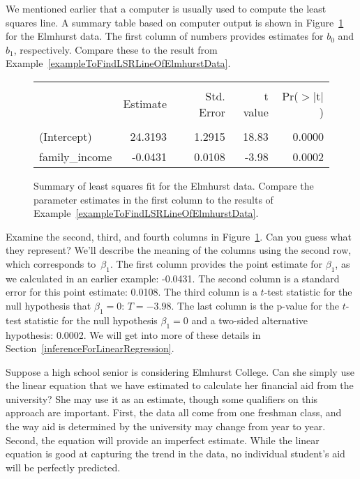 We mentioned earlier that a computer is usually used to compute the least squares line. A summary table based on computer output is shown in Figure~\ref{rOutputForIncomeAidLSRLine} for the Elmhurst data. The first column of numbers provides estimates for ${b}_0$ and ${b}_1$, respectively. Compare these to the result from Example~\ref{exampleToFindLSRLineOfElmhurstData}.

\begin{figure}[ht]
\centering
\begin{tabular}{l rrrr}
  \hline
  \vspace{-3.7mm} & & & & \\
 & Estimate & Std. Error & t value & Pr($>$$|$t$|$) \\ 
  \hline
  \vspace{-3.6mm} & & & & \\
(Intercept) & 24.3193 & 1.2915 & 18.83 & 0.0000 \\ 
family\_\hspace{0.3mm}income & -0.0431 & 0.0108 & -3.98 & 0.0002 \\ 
  \hline
\end{tabular}
\caption{Summary of least squares fit for the Elmhurst data. Compare the parameter estimates in the first column to the results of Example~\ref{exampleToFindLSRLineOfElmhurstData}.}
\label{rOutputForIncomeAidLSRLine}
\end{figure}

\begin{example}{Examine the second, third, and fourth columns in Figure~\ref{rOutputForIncomeAidLSRLine}. Can you guess what they represent?}
We'll describe the meaning of the columns using the second row, which corresponds to~$\beta_1$. The first column provides the point estimate for $\beta_1$, as we calculated in an earlier example: -0.0431. The second column is a standard error for this point estimate: 0.0108. The third column is a $t$-test statistic for the null hypothesis that $\beta_1 = 0$: $T=-3.98$. The last column is the p-value for the $t$-test statistic for the null hypothesis $\beta_1=0$ and a two-sided alternative hypothesis: 0.0002. We will get into more of these details in Section~\ref{inferenceForLinearRegression}.
\end{example}

\begin{example}{Suppose a high school senior is considering Elmhurst College. Can she simply use the linear equation that we have estimated to calculate her financial aid from the university?}
She may use it as an estimate, though some qualifiers on this approach are important. First, the data all come from one freshman class, and the way aid is determined by the university may change from year to year. Second, the equation will provide an imperfect estimate. While the linear equation is good at capturing the trend in the data, no individual student's aid will be perfectly predicted.
\end{example} 



